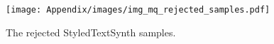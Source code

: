 \begin{figure}[ht]
    \centering
    \texttt{[image: Appendix/images/img\_mq\_rejected\_samples.pdf]}
    \caption{The rejected StyledTextSynth samples.}
    \label{fig:mq_reject_sample}
\end{figure}